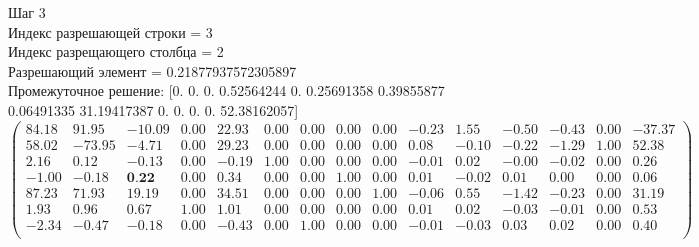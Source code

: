 \documentclass[draft]{article}
\begin{document}
\begin{flushleft}
    Шаг 3 \\
    Индекс разрешающей строки = 3\\
    Индекс разрещающего столбца = 2\\
    Разрешающий элемент = 0.21877937572305897\\
    Промежуточное решение:
    [0.  0.  0.  0.52564244  0.  0.25691358  0.39855877  0.06491335  31.19417387  0.  0.  0.  0.  52.38162057]
\begin{equation*}
\begin{pmatrix}
    84.18 &  91.95 & -10.09 & 0.00 & 22.93 & 0.00 & 0.00 & 0.00 & 0.00 & -0.23 &  1.55 & -0.50 & -0.43 & 0.00 & -37.37 \\
    58.02 & -73.95 &  -4.71 & 0.00 & 29.23 & 0.00 & 0.00 & 0.00 & 0.00 &  0.08 & -0.10 & -0.22 & -1.29 & 1.00 &  52.38 \\
    2.16 &   0.12 &  -0.13 & 0.00 & -0.19 & 1.00 & 0.00 & 0.00 & 0.00 & -0.01 &  0.02 & -0.00 & -0.02 & 0.00 &   0.26 \\
    -1.00 &  -0.18 &   \textbf{0.22} & 0.00 &  0.34 & 0.00 & 0.00 & 1.00 & 0.00 &  0.01 & -0.02 &  0.01 &  0.00 & 0.00 &   0.06 \\
    87.23 &  71.93 &  19.19 & 0.00 & 34.51 & 0.00 & 0.00 & 0.00 & 1.00 & -0.06 &  0.55 & -1.42 & -0.23 & 0.00 &  31.19 \\
    1.93 &   0.96 &   0.67 & 1.00 &  1.01 & 0.00 & 0.00 & 0.00 & 0.00 &  0.01 &  0.02 & -0.03 & -0.01 & 0.00 &   0.53 \\
    -2.34 &  -0.47 &  -0.18 & 0.00 & -0.43 & 0.00 & 1.00 & 0.00 & 0.00 & -0.01 & -0.03 &  0.03 &  0.02 & 0.00 &   0.40 \\
\end{pmatrix}
\end{equation*}
\end{flushleft}
\end{document}
